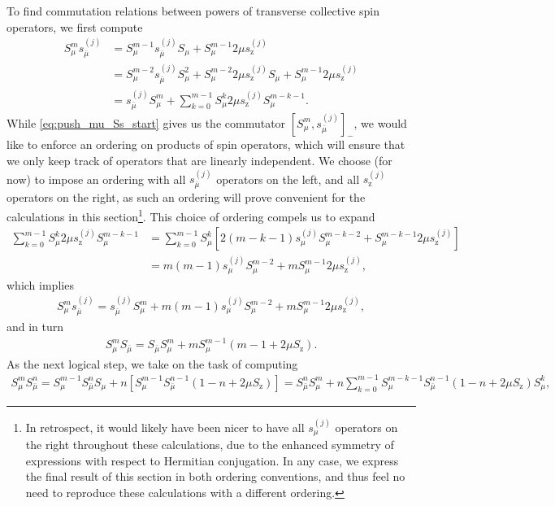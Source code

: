 \documentclass[pra,reprint,longbibliography]{revtex4-1}
\newcommand{\p}[1]{\left(#1\right)} %
\renewcommand{\sp}[1]{\left[#1\right]} %
\newcommand{\z}{\text{z}}
\newcommand{\bmu}{{\bar\mu}}
\newcommand{\1}{\mathds{1}}
\begin{document}
To find commutation relations between powers of transverse collective
spin operators, we first compute
\begin{align}
  S_\mu^m s_\bmu^{(j)}
  &= S_\mu^{m-1}s_\bmu^{(j)} S_\mu
  + S_\mu^{m-1} 2\mu s_\z^{(j)} \\
  &= S_\mu^{m-2} s_\bmu^{(j)} S_\mu^2
  + S_\mu^{m-2} 2\mu s_\z^{(j)} S_\mu
  + S_\mu^{m-1} 2\mu s_\z^{(j)} \\
  &= s_\bmu^{(j)} S_\mu^m
  + \sum_{k=0}^{m-1} S_\mu^k 2\mu s_\z^{(j)} S_\mu^{m-k-1}
  \label{eq:push_mu_Ss_start}.
\end{align}
While \eqref{eq:push_mu_Ss_start} gives us the commutator
$\sp{S_\mu^m,s_\bmu^{(j)}}_-$, we would like to enforce an ordering on
products of spin operators, which will ensure that we only keep track
of operators that are linearly independent.  We choose (for now) to
impose an ordering with all $s_\bmu^{(j)}$ operators on the left, and
all $s_\z^{(j)}$ operators on the right, as such an ordering will
prove convenient for the calculations in this section\footnote{In
  retrospect, it would likely have been nicer to have all
  $s_\mu^{(j)}$ operators on the right throughout these calculations,
  due to the enhanced symmetry of expressions with respect to
  Hermitian conjugation.  In any case, we express the final result of
  this section in both ordering conventions, and thus feel no need to
  reproduce these calculations with a different ordering.}.  This
choice of ordering compels us to expand
\begin{align}
  \sum_{k=0}^{m-1} S_\mu^k 2\mu s_\z^{(j)} S_\mu^{m-k-1}
  &= \sum_{k=0}^{m-1} S_\mu^k
  \sp{2\p{m-k-1} s_\mu^{(j)} S_\mu^{m-k-2}
    + S_\mu^{m-k-1} 2\mu s_\z^{(j)}} \\
  &= m \p{m-1} s_\mu^{(j)} S_\mu^{m-2}
  + m S_\mu^{m-1} 2\mu s_\z^{(j)},
\end{align}
which implies
\begin{align}
  S_\mu^m s_\bmu^{(j)}
  = s_\bmu^{(j)} S_\mu^m + m \p{m-1} s_\mu^{(j)} S_\mu^{m-2}
  + m S_\mu^{m-1} 2\mu s_\z^{(j)},
  \label{eq:push_mu_Ss}
\end{align}
and in turn
\begin{align}
  S_\mu^m S_\bmu = S_\bmu S_\mu^m
  + m S_\mu^{m-1} \p{m - 1 + 2\mu S_\z}.
  \label{eq:push_mu_single}
\end{align}
As the next logical step, we take on the task of computing
\begin{align}
  S_\mu^m S_\bmu^n
  = S_\mu^{m-1} S_\bmu^n S_\mu
  + n \sp{S_\mu^{m-1} S_\bmu^{n-1} \p{1 - n + 2\mu S_\z}}
  = S_\bmu^n S_\mu^m
  + n \sum_{k=0}^{m-1} S_\mu^{m-k-1} S_\bmu^{n-1}
  \p{1 - n + 2\mu S_\z} S_\mu^k,
\end{align}
\end{document}
